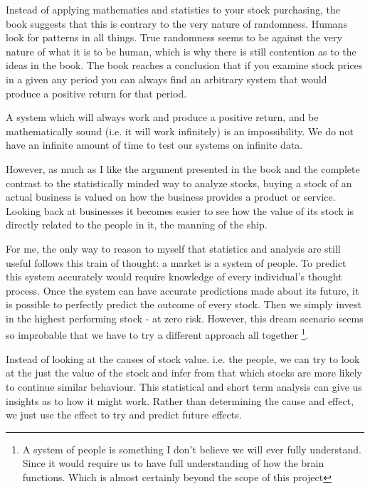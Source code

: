 \documentclass[11pt]{article}
\begin{document}
    Instead of applying mathematics and statistics to your stock purchasing, the book
    suggests that this is contrary to the 
    very nature of randomness. Humans look for patterns in all things. True 
    randomness seems to be against the very nature of what it is to be human, which is why
    there is still contention as to the ideas in the book. The book reaches a conclusion that
    if you examine stock prices in a given any period you can always find an arbitrary
    system that would produce a positive return for that period.

    A system which will always work and produce a positive return, and be mathematically sound
    (i.e. it will work infinitely) is an impossibility. We do not have an infinite amount of
    time to test our systems on infinite data.

    However, as much as I like the argument presented in the book and the complete contrast to
    the statistically minded way to analyze stocks, buying a stock of an
    actual business is valued on how the business provides a product or service.
    Looking back at businesses it becomes easier to see how the value of its stock is directly
    related to the people in it, the manning of the ship.

    For me, the only way to reason to myself that statistics and analysis are still 
    useful follows this train of thought: a market is a system of people.
    To predict this system accurately would require knowledge of every individual's
    thought process. Once the system can have accurate predictions made about its
    future, it is possible to perfectly predict the outcome of every stock. Then
    we simply invest in the highest performing stock - at zero risk. However, this
    dream scenario seems so improbable that we have to try a different approach
    all together
    \footnote{A system of people is something I don't believe we will ever fully understand.
    Since it would require us to have full understanding of how the brain functions. Which
    is almost certainly beyond the scope of this project}.

    Instead of looking at the causes of stock value. i.e. the people, we can try to look
    at the just the value of the stock and infer from that which stocks are more
    likely to continue similar behaviour. This 
    statistical and short term analysis can give us insights as to 
    how it might work. Rather than determining the cause and effect, we just use the effect
    to try and predict future effects.
\end{document}
